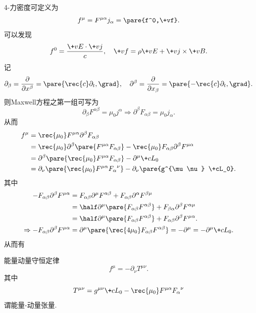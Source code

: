 \documentclass[hidelinks]{ctexart}
\begin{document}
4-力密度可定义为
\[ f^\mu = F^{\mu \alpha}j_\alpha = \pare{f^0,\+vf}. \]
可以发现
\[ f^0 = \frac{\+vE\cdot \+vj}{c},\quad \+vf = \rho \+vE + \+vj\times \+vB. \]
记
\[ \partial_\beta = \frac{\partial}{\partial x^\beta} = \pare{\rec{c}\partial_t, \grad},\quad \partial^\beta = \frac{\partial}{\partial x_\beta} = \pare{-\rec{c}\partial_t,\grad}. \]
则Maxwell方程之第一组可写为
\[ \partial_\beta F^{\alpha\beta} = \mu_0 j^\alpha \Rightarrow \partial^\beta F_{\alpha\beta} = \mu_0 j_\alpha. \]
从而
\begin{align*}
    f^\mu &= \rec{\mu_0} F^{\mu\alpha}\partial^\beta F_{\alpha\beta} \\
    &= \rec{\mu_0}\partial^\beta \pare{F^{\mu\alpha} F_{\alpha\beta}} - \rec{\mu_0} F_{\alpha\beta} \partial^\beta F^{\mu\alpha} \\
    &= \partial^\beta \pare{\rec{\mu_0} F^{\mu\alpha}F_{\alpha\beta}} - \partial^\mu \+cL_0 \\
    &= \partial_\nu \pare{\rec{\mu_0} F^{\mu\alpha} {F_\alpha}^\nu} - \partial_\nu \pare{g^{\mu\nu} \+cL_0}.
\end{align*}
其中
\begin{align*}
    -F_{\alpha\beta}\partial^\beta F^{\mu\alpha} &= F_{\alpha\beta}\partial^\mu F^{\alpha\beta} + F_{\alpha\beta} \partial^\alpha F^{\beta\mu} \\
    &= \half \partial^\mu \pare{F_{\alpha\beta} F^{\alpha\beta}} + F_{\beta\alpha} \partial^{\beta}F^{\alpha\mu} \\
    &= \half \partial^\mu \pare{F_{\alpha\beta}F^{\alpha\beta}} + F_{\alpha\beta}\partial^\beta F^{\mu\alpha}. \\
    \Rightarrow -F_{\alpha\beta}\partial^\beta F^{\mu\alpha} &= \partial^\mu \pare{\rec{4\mu_0} F_{\alpha\beta}F^{\alpha\beta}} = -\partial^\mu = -\partial^\mu \+cL_0.
\end{align*}
从而有
\begin{resume}
    能量动量守恒定律
    \[ f^\mu = -\partial_\nu T^{\mu\nu}. \]
    其中
    \[ T^{\mu\nu} = g^{\mu\nu} \+cL_0 - \rec{\mu_0} F^{\mu\alpha} {F_\alpha}^\nu \]
    谓能量-动量张量.
\end{resume}
\end{document}
